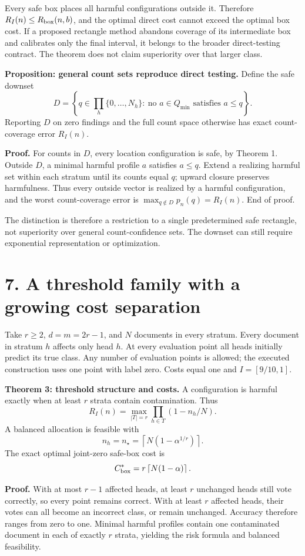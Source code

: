 \documentclass[11pt]{article}
\begin{document}
Every safe box places all harmful configurations outside it. Therefore $R_I(n)\le R_{\rm box}(n,b)$, and the optimal direct cost cannot exceed the optimal box cost. If a proposed rectangle method abandons coverage of its intermediate box and calibrates only the final interval, it belongs to the broader direct-testing contract. The theorem does not claim superiority over that larger class.

\textbf{Proposition: general count sets reproduce direct testing.} Define the safe downset
\[
D=\left\{q\in\prod_h\{0,\ldots,N_h\}:\ \text{no }a\in Q_{\min}\text{ satisfies }a\le q\right\}.
\]
Reporting $D$ on zero findings and the full count space otherwise has exact count-coverage error $R_I(n)$.

\textbf{Proof.} For counts in $D$, every location configuration is safe, by Theorem 1. Outside $D$, a minimal harmful profile $a$ satisfies $a\le q$. Extend a realizing harmful set within each stratum until its counts equal $q$; upward closure preserves harmfulness. Thus every outside vector is realized by a harmful configuration, and the worst count-coverage error is $\max_{q\notin D}p_n(q)=R_I(n)$. End of proof.

The distinction is therefore a restriction to a single predetermined safe rectangle, not superiority over general count-confidence sets. The downset can still require exponential representation or optimization.

\section*{7. A threshold family with a growing cost separation}

Take $r\ge2$, $d=m=2r-1$, and $N$ documents in every stratum. Every document in stratum $h$ affects only head $h$. At every evaluation point all heads initially predict its true class. Any number of evaluation points is allowed; the executed construction uses one point with label zero. Costs equal one and $I=[9/10,1]$.

\textbf{Theorem 3: threshold structure and costs.} A configuration is harmful exactly when at least $r$ strata contain contamination. Thus
\[
R_I(n)=\max_{|T|=r}\prod_{h\in T}(1-n_h/N).
\]
A balanced allocation is feasible with
\[
n_h=n_\star=\left\lceil N(1-\alpha^{1/r})\right\rceil.
\]
The exact optimal joint-zero safe-box cost is
\[
C_{\rm box}^*=r\left\lceil N(1-\alpha)\right\rceil.
\]

\textbf{Proof.} With at most $r-1$ affected heads, at least $r$ unchanged heads still vote correctly, so every point remains correct. With at least $r$ affected heads, their votes can all become an incorrect class, or remain unchanged. Accuracy therefore ranges from zero to one. Minimal harmful profiles contain one contaminated document in each of exactly $r$ strata, yielding the risk formula and balanced feasibility.
\end{document}
